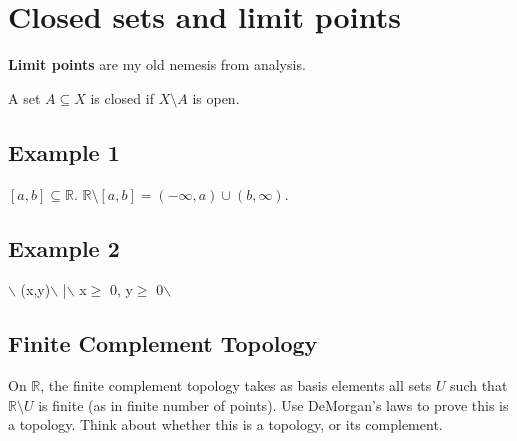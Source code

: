 \documentclass[11pt]{article}
\begin{document}
\section{Closed sets and limit points}
\label{sec:org51304c4}
\textbf{Limit points} are my old nemesis from analysis. 

A set \(A \subseteq X\) is closed if \(X\setminus A\) is open.


\subsection{Example 1}
\label{sec:orgcf14560}

\([a,b] \subseteq \mathbb{R}\). \(\mathbb{R} \setminus [a,b] = (-\infty,a)\cup (b,\infty)\). 

\subsection{Example 2}
\label{sec:org2d8cea3}

$\backslash${ (x,y)$\backslash$ |$\backslash$ x\(\ge\) 0, y\(\ge\) 0$\backslash$}

\subsection{Finite Complement Topology}
\label{sec:org6e64dae}

On \(\mathbb{R}\), the finite complement topology takes as basis
elements all sets \(U\) such that \(\mathbb{R}\setminus U\) is finite (as
in finite number of points). Use DeMorgan's laws to prove this is a
topology. Think about whether this is a topology, or its complement.
\end{document}
